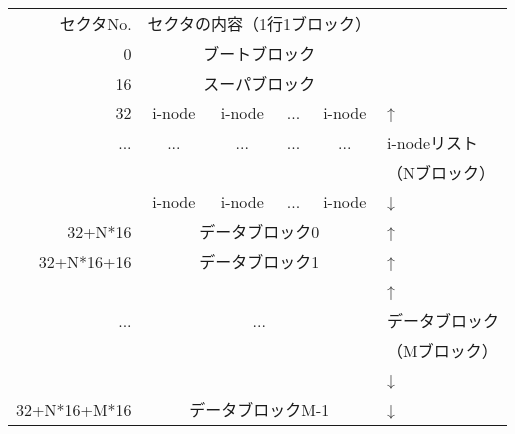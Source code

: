 \documentclass[border=1mm]{standalone}
\begin{document}
\ttfamily\begin{tabular}{r |c | c | c | c| l}
\multicolumn{1}{r}{セクタNo.} &
\multicolumn{4}{c}{セクタの内容（1行1ブロック）} & \\\cline{2-5}
0            & \multicolumn{4}{|c|}{ブートブロック}   &                \\
\cline{2-5}
16           & \multicolumn{4}{|c|}{スーパブロック}   &                \\
\cline{2-5}
32           & i-node & i-node & ...    & i-node      & ↑              \\
\cline{2-5}
...          & ...    & ...    & ...    & ...         & i-nodeリスト   \\
             &        &        &        &             & （Nブロック）  \\
\cline{2-5}
             & i-node & i-node & ...    & i-node      & ↓              \\
\cline{2-5}
32+N*16      & \multicolumn{4}{|c|}{データブロック0}  & ↑              \\
\cline{2-5}
32+N*16+16   & \multicolumn{4}{|c|}{データブロック1}  & ↑              \\
\cline{2-5}
             & \multicolumn{4}{|c|}{}                 & ↑              \\
   ...       & \multicolumn{4}{|c|}{...}              & データブロック \\
             & \multicolumn{4}{|c|}{}                 & （Mブロック）  \\
             & \multicolumn{4}{|c|}{}                 & ↓              \\
\cline{2-5}
32+N*16+M*16 & \multicolumn{4}{|c|}{データブロックM-1}& ↓              \\
\cline{2-5}
\end{tabular}
\end{document}
